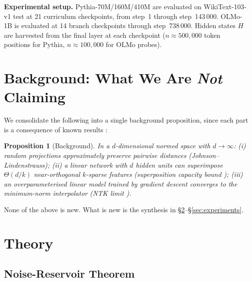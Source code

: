 \documentclass[10pt]{article}
\theoremstyle{plain}
\newtheorem{proposition}[theorem]{Proposition}
\theoremstyle{definition}
\theoremstyle{remark}
\begin{document}
\textbf{Experimental setup.}
Pythia-70M/160M/410M \citep{biderman2023pythia} are evaluated on
WikiText-103-v1 test at 21 curriculum checkpoints, from step~1 through
step~143\,000.
OLMo-1B \citep{olmo2024} is evaluated at 14 branch checkpoints through
step~738\,000.
Hidden states $H$ are harvested from the final layer at each checkpoint
($n \approx 500{,}000$ token positions for Pythia, $n \approx 100{,}000$ for
OLMo probes).

\section{Background: What We Are \emph{Not} Claiming}
\label{sec:background}

We consolidate the following into a single background proposition, since
each part is a consequence of known results \citep{gorban2018blessing,
jacot2018ntk,elhage2022superposition}:

\begin{proposition}[Background]\label{prop:background}
In a $d$-dimensional normed space with $d \to \infty$:
(i) random projections approximately preserve pairwise distances
    (Johnson--Lindenstrauss);
(ii) a linear network with $d$ hidden units can superimpose
    $\Theta(d/k)$ near-orthogonal $k$-sparse features
    (superposition capacity bound \citep{elhage2022superposition});
(iii) an overparameterised linear model trained by gradient descent
    converges to the minimum-norm interpolator
    (NTK limit \citep{jacot2018ntk}).
\end{proposition}

None of the above is new. What is new is the synthesis in
\S\ref{sec:theory}--\S\ref{sec:experiments}.

\section{Theory}
\label{sec:theory}

\subsection{Noise-Reservoir Theorem}
\end{document}

